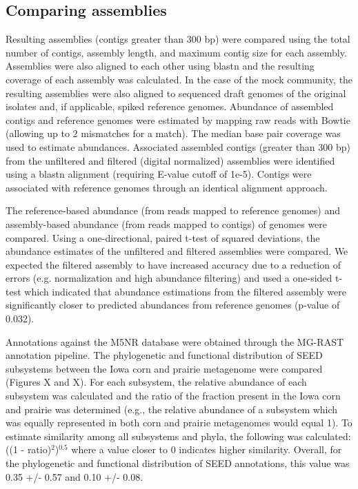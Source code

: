\documentclass[11pt]{article} %
\begin{document}
\subsection{Comparing assemblies}
Resulting assemblies (contigs greater than 300 bp) were compared using the total number of contigs, assembly length, and maximum contig size for each assembly.  Assemblies were also aligned to each other using blastn and the resulting coverage of each assembly was calculated.  In the case of the mock community, the resulting assemblies were also aligned to sequenced draft genomes of the original isolates and, if applicable, spiked reference genomes. Abundance of assembled contigs and reference genomes were estimated by mapping raw reads with Bowtie (allowing up to 2 mismatches for a match).  The median base pair coverage was used to estimate abundances.  Associated assembled contigs (greater than 300 bp) from the unfiltered and filtered (digital normalized) assemblies were identified using a blastn alignment (requiring E-value cutoff of 1e-5).  Contigs were associated with reference genomes through an identical alignment approach.

The reference-based abundance (from reads mapped to reference genomes) and assembly-based abundance (from reads mapped to contigs) of genomes were compared.  Using a one-directional, paired t-test of squared deviations, the abundance estimates of the unfiltered and filtered assemblies were compared.  We expected the filtered assembly to have increased accuracy due to a reduction of errors (e.g. normalization and high abundance filtering) and used a one-sided t-test which indicated that abundance estimations from the filtered assembly were significantly closer to predicted abundances from reference genomes (p-value of 0.032).

Annotations against the M5NR database were obtained through the MG-RAST annotation pipeline.  The phylogenetic and functional distribution of SEED subsystems between the Iowa corn and prairie metagenome were compared (Figures X and X).  For each subsystem, the relative abundance of each subsystem was calculated and the ratio of the fraction present in the Iowa corn and prairie was determined (e.g., the relative abundance of a subsystem which was equally represented in both corn and prairie metagenomes would equal 1).  To estimate similarity among all subsystems and phyla, the following was calculated:  ((1 - ratio)$^2$)$^{0.5}$ where a value closer to 0 indicates higher similarity.  Overall, for the phylogenetic and functional distribution of SEED annotations, this value was 0.35 +/- 0.57 and 0.10 +/- 0.08.
\end{document}
